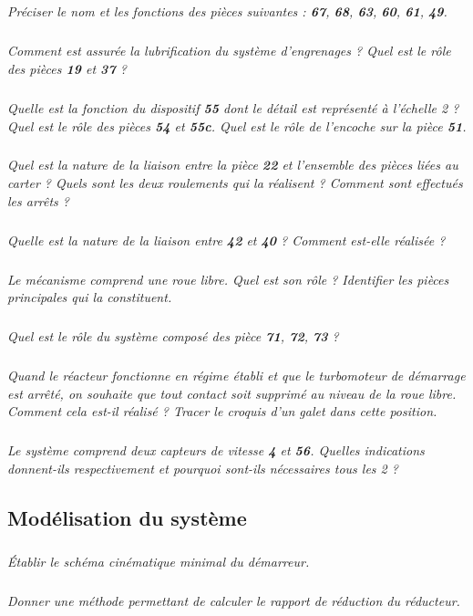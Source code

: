 \documentclass[10pt]{article}
\begin{document}
\subparagraph{}
\textit{Préciser le nom et les fonctions des pièces suivantes : \textbf{67}, \textbf{68}, \textbf{63}, \textbf{60}, \textbf{61}, \textbf{49}.}



\subparagraph{}
\textit{Comment est assurée la lubrification du système d'engrenages ? Quel est le rôle des pièces \textbf{19} et \textbf{37} ?}

\subparagraph{}
\textit{Quelle est la fonction du dispositif \textbf{55} dont le détail est représenté à l'échelle 2 ?
Quel est le rôle des pièces \textbf{54} et \textbf{55c}. Quel est le rôle de l'encoche sur la pièce \textbf{51}.}


\subparagraph{}
\textit{Quel est la nature de la liaison entre la pièce \textbf{22} et l'ensemble des pièces liées au carter ? Quels sont les deux roulements qui la réalisent ? Comment sont effectués les arrêts ?}

\subparagraph{}
\textit{Quelle est la nature de la liaison entre \textbf{42} et \textbf{40} ? Comment est-elle réalisée ?}

\subparagraph{}
\textit{Le mécanisme comprend une roue libre. Quel est son rôle ? Identifier les pièces principales qui la constituent.}

\subparagraph{}
\textit{Quel est le rôle du système composé des pièce \textbf{71}, \textbf{72}, \textbf{73} ?}

\subparagraph{}
\textit{Quand le réacteur fonctionne en régime établi et que le turbomoteur de démarrage est arrêté, on souhaite que tout contact soit supprimé au niveau de la roue libre. Comment cela est-il réalisé ? Tracer le croquis d'un galet dans cette position.}

\subparagraph{}
\textit{Le système comprend deux capteurs de vitesse \textbf{4} et \textbf{56}. Quelles indications donnent-ils respectivement et pourquoi sont-ils nécessaires tous les 2 ?}

\subsection*{Modélisation du système}

\subparagraph{}
\textit{Établir le schéma cinématique minimal du démarreur.}

\subparagraph{}
\textit{Donner une méthode permettant de calculer le rapport de réduction du réducteur.}
\end{document}
